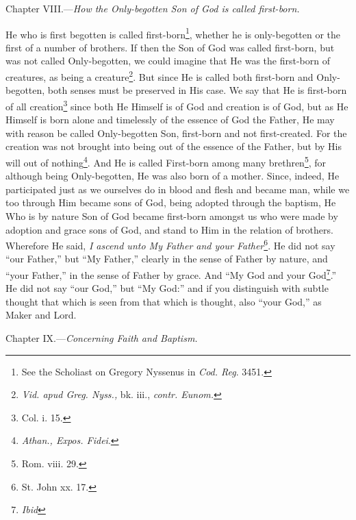 
Chapter VIII.—\emph{How the Only-begotten Son of God is called first-born.}

He who is first begotten is called first-born\footnote{See the Scholiast on Gregory Nyssenus in \emph{Cod. Reg}. 3451.}, whether he is only-begotten or the first of a number of brothers. If then the Son of God was called first-born, but was not called Only-begotten, we could imagine that He was the first-born of creatures, as being a creature\footnote{\emph{Vid. apud Greg. Nyss., }bk. iii., \emph{contr. Eunom.}}. But since He is called both first-born and Only-begotten, both senses must be preserved in His case. We say that He is first-born of all creation\footnote{Col. i. 15.} since both He Himself is of God and creation is of God, but as He Himself is born alone and timelessly of the essence of God the Father, He may with reason be called Only-begotten Son, first-born and not first-created. For the creation was not brought into being out of the essence of the Father, but by His will out of nothing\footnote{\emph{Athan., Expos. Fidei}.}. And He is called First-born among many brethren\footnote{Rom. viii. 29.}, for although being Only-begotten, He was also born of a mother. Since, indeed, He participated just as we ourselves do in blood and flesh and became man, while we too through Him became sons of God, being adopted through the baptism, He Who is by nature Son of God became first-born amongst us who were made by adoption and grace sons of God, and stand to Him in the relation of brothers. Wherefore He said, \emph{I ascend unto My Father and your Father}\footnote{St. John xx. 17.}. He did not say “our Father,” but “My Father,” clearly in the sense of Father by nature, and “your Father,” in the sense of Father by grace. And “My God and your God\footnote{\emph{Ibid}}.” He did not say “our God,” but “My God:” and if you distinguish with subtle thought that which is seen from that which is thought, also “your God,” as Maker and Lord.


Chapter IX.—\emph{Concerning Faith and Baptism.}

